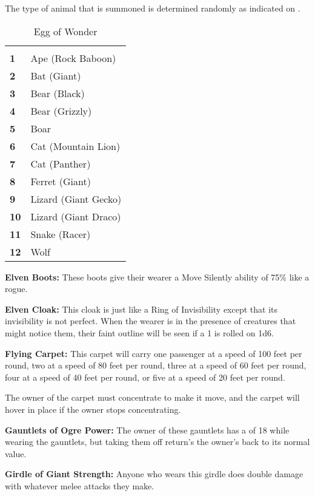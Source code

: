 \begin{multicols*}{2}
The type of animal that is summoned is determined randomly as indicated on .

\begin {table}[H]
  \caption{Egg of Wonder}\label{tab:Egg of Wonder}
  \begin{tabularx}{\columnwidth}{>{\bfseries}YY}
	 & \\
	1 & Ape (Rock Baboon)\\
	2 & Bat (Giant)\\
	3 & Bear (Black)\\
	4 & Bear (Grizzly)\\
	5 & Boar\\
	6 & Cat (Mountain Lion)\\
	7 & Cat (Panther)\\
	8 & Ferret (Giant)\\
	9 & Lizard (Giant Gecko)\\
	10 & Lizard (Giant Draco)\\
	11 & Snake (Racer)\\
	12 & Wolf
  \end {tabularx}
\end {table}

\textbf{Elven Boots:} These boots give their wearer a Move Silently ability of 75\% like a rogue.

\textbf{Elven Cloak:} This cloak is just like a Ring of Invisibility except that its invisibility is not perfect. When the wearer is in the presence of creatures that might notice them, their faint outline will be seen if a 1 is rolled on 1d6.

\textbf{Flying Carpet:}\label{mitem:Flying Carpet} This carpet will carry one passenger at a speed of 100 feet per round, two at a speed of 80 feet per round, three at a speed of 60 feet per round, four at a speed of 40 feet per round, or five at a speed of 20 feet per round.

The owner of the carpet must concentrate to make it move, and the carpet will hover in place if the owner stops concentrating.

\textbf{Gauntlets of Ogre Power:} The owner of these gauntlets has a  of 18 while wearing the gauntlets, but taking them off return’s the owner’s  back to its normal value.

\textbf{Girdle of Giant Strength:} Anyone who wears this girdle does double damage with whatever melee attacks they make.


\end{multicols*}

